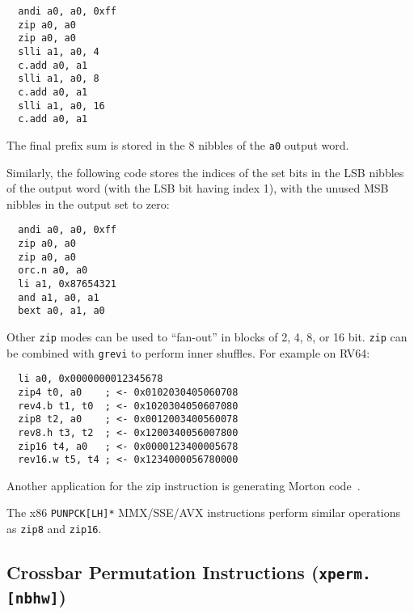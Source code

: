 \begin{minipage}{\linewidth}
\begin{verbatim}
  andi a0, a0, 0xff
  zip a0, a0
  zip a0, a0
  slli a1, a0, 4
  c.add a0, a1
  slli a1, a0, 8
  c.add a0, a1
  slli a1, a0, 16
  c.add a0, a1
\end{verbatim}
\end{minipage}

The final prefix sum is stored in the 8 nibbles of the {\tt a0} output word.

Similarly, the following code stores the indices of the set bits in the LSB
nibbles of the output word (with the LSB bit having index 1), with the unused
MSB nibbles in the output set to zero:

\begin{minipage}{\linewidth}
\begin{verbatim}
  andi a0, a0, 0xff
  zip a0, a0
  zip a0, a0
  orc.n a0, a0
  li a1, 0x87654321
  and a1, a0, a1
  bext a0, a1, a0
\end{verbatim}
\end{minipage}

Other {\tt zip} modes can be used to ``fan-out'' in blocks of 2, 4, 8, or 16 bit.
{\tt zip} can be combined with {\tt grevi} to perform inner shuffles. For example
on RV64:

\begin{minipage}{\linewidth}
\begin{verbatim}
  li a0, 0x0000000012345678
  zip4 t0, a0    ; <- 0x0102030405060708
  rev4.b t1, t0  ; <- 0x1020304050607080
  zip8 t2, a0    ; <- 0x0012003400560078
  rev8.h t3, t2  ; <- 0x1200340056007800
  zip16 t4, a0   ; <- 0x0000123400005678
  rev16.w t5, t4 ; <- 0x1234000056780000
\end{verbatim}
\end{minipage}

Another application for the zip instruction is generating Morton
code~\cite{MortonCode}.

The x86 {\tt PUNPCK[LH]*} MMX/SSE/AVX instructions perform similar operations
as {\tt zip8} and {\tt zip16}.


\subsection{Crossbar Permutation Instructions (\texttt{xperm.[nbhw]})}

